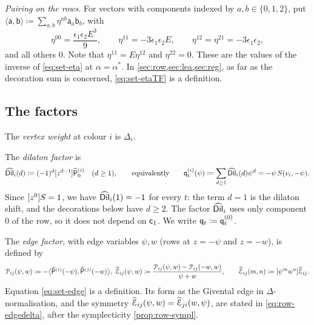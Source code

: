 \emph{Pairing on the rows.} For vectors with components indexed by $a,b\in\{0,1,2\}$, put $\langle\mathsf{a},\mathsf{b}\rangle\coloneqq\sum_{a,b}\eta^{ab}\mathsf{a}_a\mathsf{b}_b$, with
\begin{equation}
\label{eq:set-etaTF}
\eta^{00}=\frac{\epsilon_1\epsilon_2E^3}{9},\qquad\eta^{11}=-3\epsilon_1\epsilon_2E,\qquad\eta^{12}=\eta^{21}=-3\epsilon_1\epsilon_2,
\end{equation}
and all others $0$. Note that $\eta^{11}=E\eta^{12}$ and $\eta^{22}=0$. These are the values of the inverse of \eqref{eq:set-eta} at $\alpha=\alpha^*$. In \cref{sec:row,sec:lea,sec:reg}, as far as the decoration sum is concerned, \eqref{eq:set-etaTF} is a definition.

\subsection{The factors}
\label{sec:set-factors}

The \emph{vertex weight} at colour $i$ is $\Delta_i$.

The \emph{dilaton factor} is
\begin{equation}
\label{eq:set-dil}
\widehat{\mathsf{Dil}}_i(d)\coloneqq(-1)^d[z^{d-1}]\widehat{\mathsf{P}}_0^{(i)}\quad(d\geq1),\qquad\text{equivalently}\qquad
\mathsf{q}_{t}^{(i)}(\psi)\coloneqq\sum_{d\geq1}\widehat{\mathsf{Dil}}_i(d)\psi^d=-\psi\,S(v_i,-\psi).
\end{equation}
Since $[z^0]S=1$, we have $\widehat{\mathsf{Dil}}_i(1)=-1$ for every $t$: the term $d=1$ is the dilaton shift, and the decorations below have $d\geq2$. The factor $\widehat{\mathsf{Dil}}_i$ uses only component $0$ of the row, so it does not depend on $\mathsf{c}_{1}$. We write $\mathsf{q}_{t}\coloneqq\mathsf{q}_{t}^{(0)}$.

The \emph{edge factor}, with edge variables $\psi,w$ (rows at $z=-\psi$ and $z=-w$), is defined by
\begin{equation}
\label{eq:set-edge}
\begin{gathered}
\mathcal{P}_{ij}(\psi,w)\coloneqq-\big\langle\widehat{\mathsf{P}}^{(i)}(-\psi),\widehat{\mathsf{P}}^{(j)}(-w)\big\rangle,\
\widehat{\mathcal{E}}_{ij}(\psi,w)\coloneqq\frac{\mathcal{P}_{ij}(\psi,w)-\mathcal{P}_{ij}(-w,w)}{\psi+w},\qquad
\widehat{\mathcal{E}}_{ij}(m,n)\coloneqq[\psi^mw^n]\widehat{\mathcal{E}}_{ij}.
\end{gathered}
\end{equation}
Equation \eqref{eq:set-edge} is a definition. Its form as the Givental edge in $\Delta$-normalisation, and the symmetry $\widehat{\mathcal{E}}_{ij}(\psi,w)=\widehat{\mathcal{E}}_{ji}(w,\psi)$, are stated in \eqref{eq:row-edgedelta}, after the symplecticity \cref{prop:row-sympl}.


